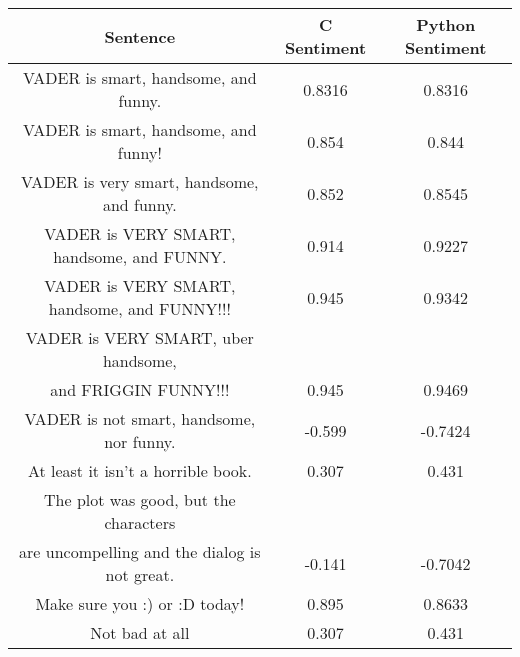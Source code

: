 \documentclass[12pt]{article}
\begin{document}
\begin{center}
	\begin{tabular}{ |c|c|c| }
		\hline
		\textbf{Sentence} & \textbf{C Sentiment} & \textbf{Python Sentiment} \\
		\hline
		VADER is smart, handsome, and funny. & 0.8316 & 0.8316 \\
		VADER is smart, handsome, and funny! & 0.854 & 0.844 \\
		VADER is very smart, handsome, and funny. & 0.852 & 0.8545 \\
		VADER is VERY SMART, handsome, and FUNNY. & 0.914 & 0.9227 \\
		VADER is VERY SMART, handsome, and FUNNY!!! & 0.945 & 0.9342 \\
		VADER is VERY SMART, uber handsome, \\ and FRIGGIN FUNNY!!! & 0.945 & 0.9469 \\
		VADER is not smart, handsome, nor funny. & -0.599 & -0.7424 \\
		At least it isn't a horrible book. & 0.307 & 0.431 \\
		The plot was good, but the characters \\ are uncompelling and the dialog is not great. & -0.141 & -0.7042 \\
		Make sure you :) or :D today! & 0.895 & 0.8633 \\
		Not bad at all & 0.307 & 0.431 \\
		\hline
	\end{tabular}
\end{center}
\end{document}
